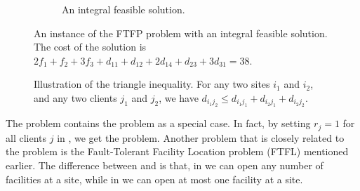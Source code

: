 \documentclass[oneside,final]{ucr}
\def\dsp{\def\baselinestretch{2.0}\large\normalsize}
\def\ssp{\def\baselinestretch{1.0}\large\normalsize}
\begin{document}
\begin{figure}[ht]
\begin{subfigure}[b]{.45\textwidth}
  \caption{An integral feasible solution.}
  \end{subfigure}
  \caption[An instance of the FTFP problem with an integral
  feasible solution.]{An instance of the FTFP problem with an
    integral feasible solution. The cost of the solution is
    $2f_1 + f_2 + 3f_3 + d_{11} + d_{12} + 2d_{14} + d_{23}
    + 3d_{31} = 38$.}
  \label{fig:ftfp_example}
\end{figure}
\dsp
\ssp
\begin{figure}[ht]
  \centering
      \caption[Illustration of the triangle
      inequality.]{Illustration of the triangle inequality.
        For any two sites $i_1$ and $i_2$, and any two
        clients $j_1$ and $j_2$, we have $d_{i_1 j_2} \leq
        d_{i_1 j_1} + d_{i_2 j_1} + d_{i_2 j_2}$.}
  \label{fig:triangle}
\end{figure}
\dsp

The {\FTFP} problem contains the {\UFL} problem as a special
case. In fact, by setting $r_j = 1$ for all clients $j$ in
{\FTFP}, we get the {\UFL} problem. Another problem that is
closely related to the {\FTFP} problem is the Fault-Tolerant
Facility Location problem (FTFL) mentioned earlier. The
difference between {\FTFP} and {\FTFL} is that, in {\FTFP}
we can open any number of facilities at a site, while in
{\FTFL} we can open at most one facility at a site.
\end{document}
